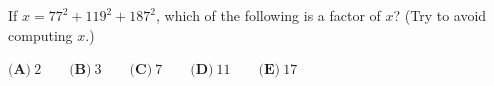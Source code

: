 If $x=77^2+119^2+187^2$, which of the following is a factor of $x$? (Try to avoid computing $x$.)

$\textbf{(A)}\ 2\qquad\textbf{(B)}\ 3\qquad\textbf{(C)}\ 7\qquad\textbf{(D)}\ 11\qquad\textbf{(E)}\ 17$
